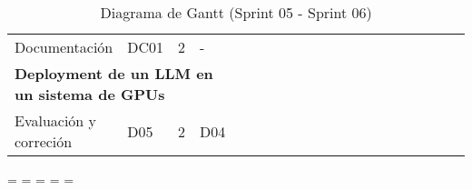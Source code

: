 \begin{table}[H]
\begin{tabular}{|llcllllllllllllllll|l}
        \multicolumn{1}{|l|}{Documentación}                                                                    & \multicolumn{1}{l|}{DC01}                              & \multicolumn{1}{c|}{2}                                   & \multicolumn{1}{l|}{-}                                                  &                                 &                                 &                                 &                                 &                                 & \cellcolor[HTML]{C9C9C9}        & \cellcolor[HTML]{C9C9C9}        & \cellcolor[HTML]{C9C9C9}        & \cellcolor[HTML]{C9C9C9}        & \cellcolor[HTML]{C9C9C9}        & \cellcolor[HTML]{C9C9C9}        & \cellcolor[HTML]{C9C9C9}        & \cellcolor[HTML]{C9C9C9}        & \cellcolor[HTML]{C9C9C9}        & \cellcolor[HTML]{C9C9C9} &  \\ \cline{1-19}
        \multicolumn{4}{|l|}{\textbf{Deployment de un LLM en un sistema de GPUs}}                                                                                                                                                                                                                            & \multicolumn{15}{l|}{}                                                                                                                                                                                                                                                                                                                                                                                                                                                                                               &  \\ \cline{1-19}
        \multicolumn{1}{|l|}{Evaluación y correción}                                                           & \multicolumn{1}{l|}{D05}                               & \multicolumn{1}{c|}{2}                                   & \multicolumn{1}{l|}{D04}                                                & \cellcolor[HTML]{3166FF}        & \cellcolor[HTML]{3166FF}        & \cellcolor[HTML]{3166FF}        & \cellcolor[HTML]{3166FF}        & \cellcolor[HTML]{3166FF}        & \cellcolor[HTML]{3166FF}        & \cellcolor[HTML]{3166FF}        & \cellcolor[HTML]{3166FF}        & \cellcolor[HTML]{3166FF}        & \cellcolor[HTML]{3166FF}        &                                 &                                 &                                 &                                 &                          &  \\ \cline{1-19}
        \end{tabular}
        \caption{Diagrama de Gantt (Sprint 05 - Sprint 06)}
        \label{tab:Diagrama_gantt_05-06}
    \end{table}
\endgroup
\newpage
\paperwidth=\pdfpageheight
\paperheight=\pdfpagewidth
\pdfpageheight=\paperheight
\pdfpagewidth=\paperwidth
\headwidth=\textwidth
